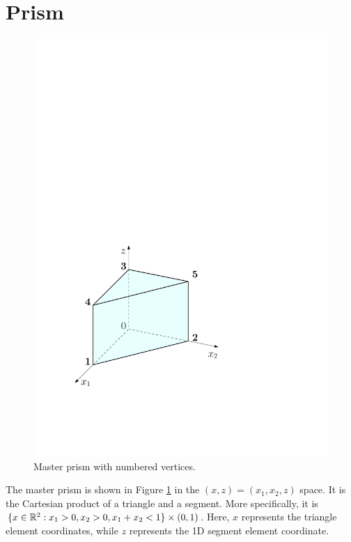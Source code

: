 \section{Prism}
\label{sec:Prism}

\begin{figure}[!ht]
\begin{center}
\includegraphics[scale=0.5]{./figures/MasterPrism.pdf}
\caption{Master prism with numbered vertices.}
\label{fig:MasterPrism}
\end{center}
\end{figure}

The master prism is shown in Figure \ref{fig:MasterPrism} in the $(x,z)=(x_1,x_2,z)$ space.
It is the Cartesian product of a triangle and a segment.
More specifically, it is $\{x\in\mathbb{R}^2:x_1>0,x_2>0,x_1+x_2<1\}\times(0,1)$.
Here, $x$ represents the triangle element coordinates, while $z$ represents the 1D segment element coordinate.

